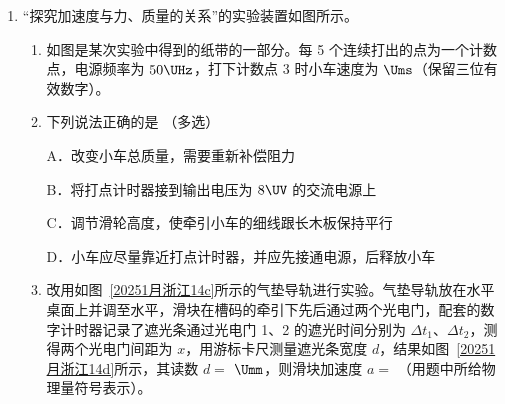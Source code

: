 \documentclass[\gkver]{gaokaozhenti}
\begin{document}
\begin{enumerate}
{联立解得 $I = \frac{\sqrt{2}\pi r^{2}B_{0}}{Rt_{0}}$

故 A 错误；

B．设右侧有一无限长的直导线 $C'D'$ 与 CD 构成回路，则 $t = 1.5t_{0}$ 时刻，CD、$C'D'$ 回路产生的总电动势为 $E_{\text{总}} = \pi r^{2} \cdot \frac{2B_{0}}{t_{0}}$

根据对称性可知 $t = 1.5t_{0}$ 时刻直导线 CD 电动势为 $\pi r^{2}\frac{B_{0}}{t_{0}}$，故 B 正确；

C．由于圆环 Ⅱ 处于磁场外部，通过圆环 Ⅱ 的磁通量一直为 0，所以圆环 Ⅱ 不会产生感应电流，则 $t = 0.5t_{0}$ 时刻圆环 Ⅱ 中电流为 0，故 C 错误；

D．以 O 点为圆心，过程 P、Q 两点圆轨道，在 $t = 0.5t_{0}$ 时刻产生的电动势为 $E = \pi r^{2}\frac{B_{0}}{t_{0}}$

则 P、Q 两点间圆弧的电动势为 $E' = \frac{30^{\circ}}{360^{\circ}}E = \frac{1}{12}\pi r^{2}\frac{B_{0}}{t_{0}}$

由于 P、Q 两点间圆弧与圆环 Ⅱ 上 PQ 构成回路不会产生感应电流，则圆环 Ⅱ 上 PQ 间电动势为 $\frac{1}{12}\pi r^{2}\frac{B_{0}}{t_{0}}$，故 D 正确。

故选 BD。
}

\item
“探究加速度与力、质量的关系”的实验装置如图所示。


\begin{enumerate}
\item
如图是某次实验中得到的纸带的一部分。每 5 个连续打出的点为一个计数点，电源频率为 $50 \UHz$，打下计数点 3 时小车速度为  $\Ums$（保留三位有效数字）。


\item
下列说法正确的是 （多选）

A．改变小车总质量，需要重新补偿阻力

B．将打点计时器接到输出电压为 $8 \UV$ 的交流电源上

C．调节滑轮高度，使牵引小车的细线跟长木板保持平行

D．小车应尽量靠近打点计时器，并应先接通电源，后释放小车

\item
改用如图~\ref{20251月浙江14c}所示的气垫导轨进行实验。气垫导轨放在水平桌面上并调至水平，滑块在槽码的牵引下先后通过两个光电门，配套的数字计时器记录了遮光条通过光电门 1、2 的遮光时间分别为 $\Delta t_{1}$、$\Delta t_{2}$，测得两个光电门间距为 $x$，用游标卡尺测量遮光条宽度 $d$，结果如图~\ref{20251月浙江14d}所示，其读数 $d =$  $\Umm$，则滑块加速度 $a =$ （用题中所给物理量符号表示）。
\end{enumerate}


\end{enumerate}
\end{document}

